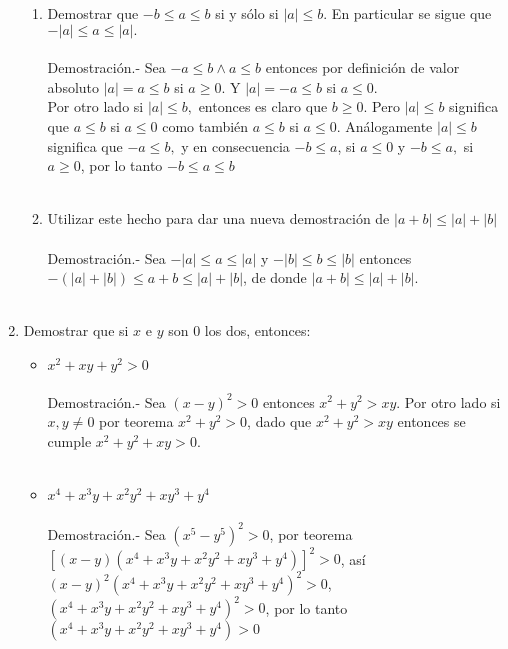 \begin{enumerate}[\bfseries 1.]
\begin{enumerate}[\bfseries (a)]
\item Demostrar que $-b \leq a \leq b$ si y sólo si $|a|\leq b.$ En particular se sigue que $-|a|\leq a \leq |a|.$\\\\
Demostración.- \; Sea $-a\leq b \land a\leq b$ entonces por definición de valor absoluto $|a|=a\leq b$ si $a\geq 0.$ Y $|a|=-a\leq b$ si $a\leq 0.$\\
Por otro lado si $|a|\leq b,$ entonces es claro que $b\geq 0$. Pero $|a|\leq b$ significa que $a\leq b$ si $a\leq 0$ como también $a\leq b$ si $a\leq 0$. Análogamente $|a|\leq b$ significa que $-a\leq b,$ y en consecuencia $-b\leq a$, si $a\leq 0$ y $-b\leq a,$ si $a\geq 0$, por lo tanto $-b\leq a \leq b$\\\\

\item Utilizar este hecho para dar una nueva demostración de $|a+b| \leq |a|+|b|$\\\\
Demostración.- \; Sea $-|a| \leq a \leq |a|$ y $-|b|\leq b \leq |b|$ entonces $-(|a|+|b|) \leq a+b \leq |a|+|b|$, de donde $|a+b| \leq |a|+|b|.$\\\\
\end{enumerate}

\item Demostrar que si $x$ e $y$ son $0$ los dos, entonces:\\
\begin{itemize}
\item $x^2+xy+y^2>0$\\\\
Demostración.- \;Sea $(x-y)^2>0$ entonces $x^2+y^2>xy$. Por otro lado  si $x,y \neq 0$ por teorema  \; $x^2+y^2>0$, dado que $x^2+y^2>xy$ entonces se cumple $x^2+y^2+xy>0$.\\\\
\item $x^4+x^3y+x^2y^2+xy^3+y^4$ \\\\
Demostración.- \; Sea $(x^5-y^5)^2>0$, por teorema $\left[ (x-y)(x^4+x^3y+x^2y^2+xy^3+y^4) \right]^2>0$, así $(x-y)^2(x^4+x^3y+x^2y^2+xy^3+y^4)^2>0$, \; $(x^4+x^3y+x^2y^2+xy^3+y^4)^2>0$, por lo tanto $(x^4+x^3y+x^2y^2+xy^3+y^4)>0$ \\\\
\end{itemize}


\end{enumerate}
